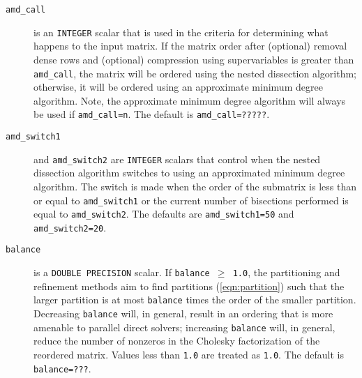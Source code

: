 \begin{description}
\item[\texttt{amd\_call}] is an {\tt INTEGER} scalar that is used in the criteria for 
determining what happens to the input matrix. If 
the matrix order after (optional) removal dense rows and (optional) compression using supervariables is greater than {\tt amd\_call}, the matrix will be 
ordered using the nested dissection algorithm; otherwise, it will be ordered using an approximate minimum 
degree algorithm. Note, the approximate minimum degree algorithm will always be used if {\tt amd\_call=n}. The 
default is {\tt amd\_call=?????}.

\item[\texttt{amd\_switch1}] and {\tt amd\_switch2} are {\tt INTEGER} scalars 
that control when the nested dissection algorithm switches to using an approximated minimum 
degree algorithm. The switch is made when the order of the submatrix is less 
than or equal to {\tt amd\_switch1} or the current number of 
bisections performed is equal to {\tt amd\_switch2}.  The 
defaults are {\tt amd\_switch1=50} and {\tt amd\_switch2=20}.

\item[\texttt{balance}] is a {\tt DOUBLE PRECISION} scalar. If {\tt balance $\ge$ 1.0}, 
the partitioning and refinement
methods aim to find partitions (\ref{eqn:partition}) such that the larger 
partition is at most {\tt balance} times the order of the smaller partition. 
Decreasing {\tt balance} will, in
general, result in an ordering that is more amenable to
parallel direct solvers; increasing {\tt balance} will, in general, reduce the
number of nonzeros in the Cholesky factorization of the reordered matrix. 
Values less than {\tt 1.0} are treated as {\tt 1.0}. The
default is {\tt balance=???}.



\end{description}
